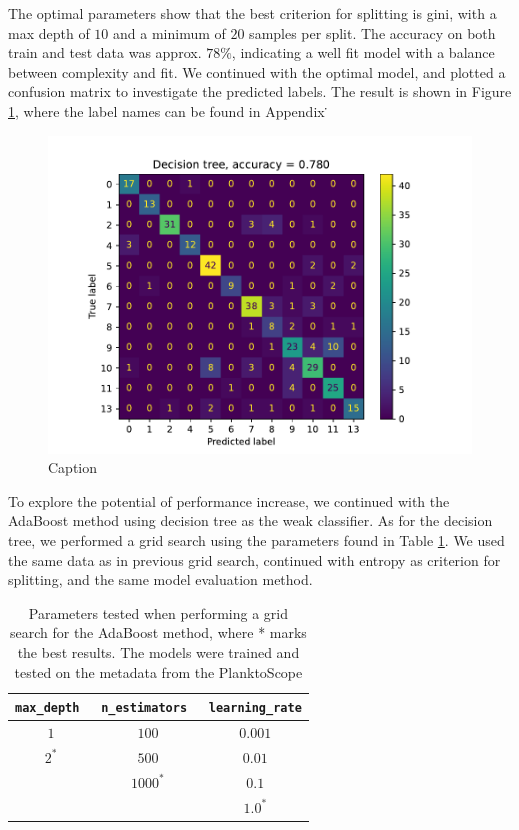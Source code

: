 The optimal parameters show that the best criterion for splitting is gini, with a max depth of $10$ and a minimum of $20$ samples per split. The accuracy on both train and test data was approx. $78\%$, indicating a well fit model with a balance between complexity and fit. 
We continued with the optimal model, and plotted a confusion matrix to investigate the predicted labels. The result is shown in Figure \ref{fig:cm_tree_metadata}, where the label names can be found in Appendix \.
\begin{figure}
    \centering
    \includegraphics[width=\linewidth]{latex/figures/cm_tree_planktoscope_metadata.pdf}
    \caption{Caption}
    \label{fig:cm_tree_metadata}
\end{figure}

To explore the potential of performance increase, we continued with the AdaBoost method using decision tree as the weak classifier. As for the decision tree, we performed a grid search using the parameters found in Table \ref{tab:params_adaboost}. We used the same data as in previous grid search, continued with entropy as criterion for splitting, and the same model evaluation method.
\begin{table}[h]
    \centering
    \begin{tabular}{ccc}
        \hline
        \verb|max_depth| \, & \verb|n_estimators| \, & \verb|learning_rate| \\
        \hline 
        $1$ & $100$ & $0.001$ \\
        $2^*$ & $500$ & $0.01$ \\
         & $1000^*$ & $0.1$ \\
         & & $1.0^*$ \\
        \hline
    \end{tabular}
    \caption{Parameters tested when performing a grid search for the AdaBoost method, where * marks the best results. The models were trained and tested on the metadata from the PlanktoScope}
    \label{tab:params_adaboost}
\end{table}

